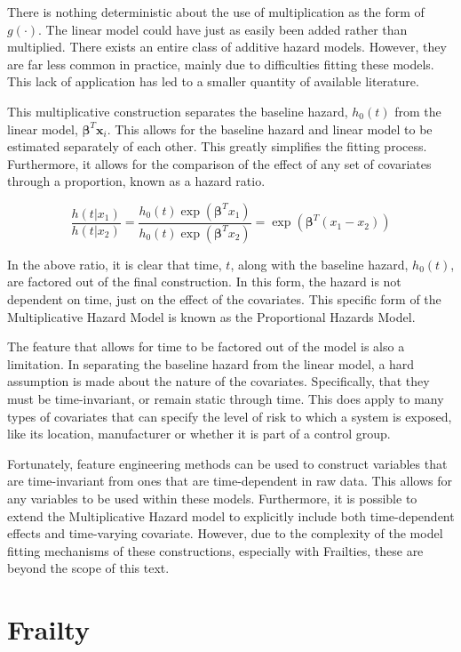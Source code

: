 There is nothing deterministic about the use of multiplication as the form of $g(\cdot)$. The linear model could have just as easily been added rather than multiplied. There exists an entire class of additive hazard models\cite{Lin1997}. However, they are far less common in practice, mainly due to difficulties fitting these models\cite{Boshuizen2010}. This lack of application has led to a smaller quantity of available literature.

This multiplicative construction separates the baseline hazard, $h_0(t)$ from the linear model, $\boldsymbol\beta^T \textbf{x}_i$. This allows for the baseline hazard and linear model to be estimated separately of each other. This greatly simplifies the fitting process. Furthermore, it allows for the comparison of the effect of any set of covariates through a proportion, known as a hazard ratio.

$$ \frac{h(t|x_1)}{h(t|x_2)} = \frac{h_0(t) \exp(\boldsymbol\beta^T x_1)}{h_0(t) \exp(\boldsymbol\beta^T x_2)}  = \exp( \boldsymbol\beta^T(x_1 - x_2) )$$

In the above ratio, it is clear that time, $t$, along with the baseline hazard, $h_0(t)$, are factored out of the final construction. In this form, the hazard is not dependent on time, just on the effect of the covariates. This specific form of the Multiplicative Hazard Model is known as the Proportional Hazards Model.

The feature that allows for time to be factored out of the model is also a limitation. In separating the baseline hazard from the linear model, a hard assumption is made about the nature of the covariates. Specifically, that they must be time-invariant, or remain static through time. This does apply to many types of covariates that can specify the level of risk to which a system is exposed, like its location, manufacturer or whether it is part of a control group. 

Fortunately, feature engineering methods can be used to construct variables that are time-invariant from ones that are time-dependent in raw data. This allows for any variables to be used within these models. Furthermore, it is possible to extend the Multiplicative Hazard model to explicitly include both time-dependent effects and time-varying covariate\cite{Dekker2008}. However, due to the complexity of the model fitting mechanisms of these constructions, especially with Frailties, these are beyond the scope of this text. 


\section*{Frailty}


